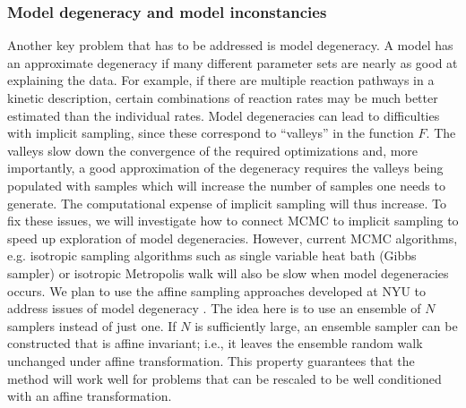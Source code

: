 \documentclass[11pt]{article}
\newcommand{\MarginPar}[1]{\marginpar{%
\vskip-\baselineskip %
\raggedright\tiny\sffamily
\hrule\smallskip{\color{red}#1}\par\smallskip\hrule}}
\begin{document}
\subsubsection*{Model degeneracy and model inconstancies}
Another key problem that has to be addressed is model degeneracy.
A model has an approximate degeneracy if many different parameter sets are nearly as good at explaining the data.
For example, if there are multiple reaction pathways in a kinetic description,
certain combinations of reaction rates may be much better
estimated than the individual rates. Model degeneracies can lead to difficulties with implicit sampling, since these correspond to ``valleys'' in  the function $F$.
The valleys slow down the convergence of the required optimizations and, more importantly, a good approximation of the degeneracy requires the valleys being populated with samples which will increase the number of samples one needs to generate.
The computational expense of implicit sampling will thus increase.
To fix these issues, we will investigate how to connect MCMC to implicit sampling to speed up exploration of model degeneracies.
However, current MCMC algorithms, e.g. isotropic sampling algorithms such as single variable heat bath (Gibbs sampler) or isotropic Metropolis walk will also be slow when model degeneracies occurs.
We plan to use the affine sampling approaches developed at NYU to address issues of model degeneracy \cite{GoodmanWeare2010}.
The idea here is to use an ensemble of $N$ samplers instead of just one. 
If $N$ is sufficiently large, an ensemble sampler can be constructed that is affine invariant; i.e., it leaves the ensemble
random walk unchanged under affine transformation.  This property guarantees that the method will work well for problems that can
be rescaled to be well conditioned with an affine transformation.
\MarginPar{(matti): Jonathan, does this make sense?}
\end{document}
